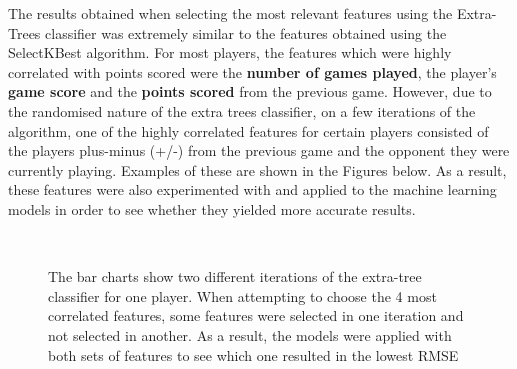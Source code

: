 \documentclass[a4paper,11pt,twoside]{article}
\begin{document}
The results obtained when selecting the most relevant features using the Extra-Trees classifier was extremely similar to the features obtained using the SelectKBest algorithm. For most players, the features which were highly correlated with points scored were the \textbf{number of games played}, the player's \textbf{game score} and the \textbf{points scored} from the previous game. However, due to the randomised nature of the extra trees classifier, on a few iterations of the algorithm, one of the highly correlated features for certain players consisted of the players plus-minus (+/-) from the previous game and the opponent they were currently playing. Examples of these are shown in the Figures below. As a result, these features were also experimented with and applied to the machine learning models in order to see whether they yielded more accurate results.


\begin{figure} [h!]
 \captionsetup{justification=centering}
\\
\caption{The bar charts show two different iterations of the extra-tree classifier for one player. When attempting to choose the 4 most correlated features, some features were selected in one iteration and not selected in another. As a result, the models were applied with both sets of features to see which one resulted in the lowest RMSE}
\end{figure}
\end{document}
